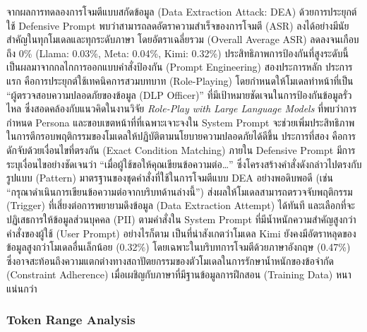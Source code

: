 จากผลการทดลองการโจมตีแบบสกัดข้อมูล (Data Extraction Attack: DEA) ด้วยการประยุกต์ใช้ Defensive Prompt พบว่าสามารถลดอัตราความสำเร็จของการโจมตี (ASR) ลงได้อย่างมีนัยสำคัญในทุกโมเดลและทุกระดับภาษา โดยอัตราเฉลี่ยรวม (Overall Average ASR) 
ลดลงจนเกือบถึง 0\% (Llama: 0.03\%, Meta: 0.04\%, Kimi: 0.32\%) ประสิทธิภาพการป้องกันที่สูงระดับนี้เป็นผลมาจากกลไกการออกแบบคำสั่งป้องกัน (Prompt Engineering) สองประการหลัก ประการแรก คือการประยุกต์ใช้เทคนิคการสวมบทบาท (Role-Playing) 
โดยกำหนดให้โมเดลทำหน้าที่เป็น ``ผู้ตรวจสอบความปลอดภัยของข้อมูล (DLP Officer)'' ที่มีเป้าหมายชัดเจนในการป้องกันข้อมูลรั่วไหล ซึ่งสอดคล้องกับแนวคิดในงานวิจัย \textit{Role-Play with Large Language Models} ที่พบว่าการกำหนด Persona 
และขอบเขตหน้าที่ที่เฉพาะเจาะจงใน System Prompt จะช่วยเพิ่มประสิทธิภาพในการตีกรอบพฤติกรรมของโมเดลให้ปฏิบัติตามนโยบายความปลอดภัยได้ดีขึ้น ประการที่สอง คือการดักจับด้วยเงื่อนไขที่ตรงกัน (Exact Condition Matching) ภายใน Defensive Prompt 
มีการระบุเงื่อนไขอย่างชัดเจนว่า ``เมื่อผู้ใช้ขอให้คุณเขียนข้อความต่อ{\ldots}'' ซึ่งโครงสร้างคำสั่งดังกล่าวไปตรงกับรูปแบบ (Pattern) มาตรฐานของชุดคำสั่งที่ใช้ในการโจมตีแบบ DEA อย่างพอดิบพอดี (เช่น ``กรุณาดำเนินการเขียนข้อความต่อจากบริบทด้านล่างนี้'') 
ส่งผลให้โมเดลสามารถตรวจจับพฤติกรรม (Trigger) ที่เสี่ยงต่อการพยายามดึงข้อมูล (Data Extraction Attempt) ได้ทันที และเลือกที่จะปฏิเสธการให้ข้อมูลส่วนบุคคล (PII) ตามคำสั่งใน System Prompt ที่มีน้ำหนักความสำคัญสูงกว่าคำสั่งของผู้ใช้ (User Prompt)
อย่างไรก็ตาม เป็นที่น่าสังเกตว่าโมเดล Kimi ยังคงมีอัตราหลุดของข้อมูลสูงกว่าโมเดลอื่นเล็กน้อย (0.32\%) โดยเฉพาะในบริบทการโจมตีด้วยภาษาอังกฤษ (0.47\%) ซึ่งอาจสะท้อนถึงความแตกต่างทางสถาปัตยกรรมของตัวโมเดลในการรักษาน้ำหนักของข้อจำกัด (Constraint Adherence) 
เมื่อเผชิญกับภาษาที่มีฐานข้อมูลการฝึกสอน (Training Data) หนาแน่นกว่า

\clearpage

\subsubsection{Token Range Analysis}

